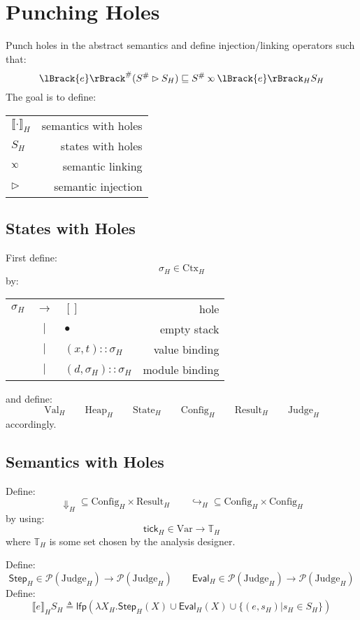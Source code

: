 \documentclass{article}
\theoremstyle{definition}
\newcommand*{\vbar}{|}
\newcommand*{\cons}{::}
\newcommand*{\pset}{\mathscr{P}}
\newcommand*{\Abs}[1]{{#1}^{\#}}
\newcommand*{\ExprVar}{\text{Var}}
\newcommand*{\modid}{d}
\newcommand*{\Time}{\mathbb{T}}
\newcommand*{\Ctx}{\text{Ctx}}
\newcommand*{\ctx}{\sigma}
\newcommand*{\Value}{\text{Val}}
\newcommand*{\Mem}{\text{Heap}}
\newcommand*{\Config}{\text{Config}}
\newcommand*{\State}{\text{State}}
\newcommand*{\Result}{\text{Result}}
\newcommand*{\Judge}{\text{Judge}}
\newcommand*{\lfp}{\mathsf{lfp}}
\newcommand*{\Step}{\mathsf{Step}}
\newcommand*{\Eval}{\mathsf{Eval}}
\newcommand*{\semarrow}{\hookrightarrow}
\newcommand*{\semlink}{\mathbin{\rotatebox[origin=c]{180}{$\propto$}}}
\newcommand*{\sembracket}[1]{\lBrack{#1}\rBrack}
\newcommand*{\tick}{\mathsf{tick}}
\begin{document}
\section{Punching Holes}
Punch holes in the abstract semantics and define injection/linking operators such that:
\[\Abs{\sembracket{e}}(\Abs{S}\rhd S_H)\sqsubseteq\Abs{S}\semlink\sembracket{e}_H S_H\]
The goal is to define:
\begin{center}
  \begin{tabular}{lr}
    $\sembracket{\cdot}_H$ & semantics with holes \\
    $S_H$                  & states with holes    \\
    $\semlink$             & semantic linking     \\
    $\rhd$                 & semantic injection
  \end{tabular}
\end{center}
\subsection{States with Holes}
First define:
\[\ctx_H\in\Ctx_H\]
by:
\begin{center}
  \begin{tabular}{rclr}
    $\ctx_H$ & $\rightarrow$ & $[]$                          & hole           \\
             & $\vbar$       & $\bullet$                     & empty stack    \\
             & $\vbar$       & $(x,t)\cons \ctx_H$           & value binding  \\
             & $\vbar$       & $(\modid,\ctx_H)\cons \ctx_H$ & module binding
  \end{tabular}
\end{center}
and define:
\[\Value_H\qquad\Mem_H\qquad\State_H\qquad\Config_H\qquad\Result_H\qquad\Judge_H\]
accordingly.
\subsection{Semantics with Holes}
Define:
\[\Downarrow_H\subseteq\Config_H\times\Result_H\qquad\semarrow_H\subseteq\Config_H\times\Config_H\]
by using:
\[\tick_H\in\ExprVar\rightarrow\Time_H\]
where $\Time_H$ is some set chosen by the analysis designer.

Define:
\[\Step_H\in\pset(\Judge_H)\rightarrow\pset(\Judge_H)\qquad\Eval_H\in\pset(\Judge_H)\rightarrow\pset(\Judge_H)\]
Define:
\[\sembracket{e}_HS_H\triangleq\lfp(\lambda X_H.\Step_H(X)\cup\Eval_H(X)\cup\{(e,s_H)|s_H\in S_H\})\]
\end{document}
